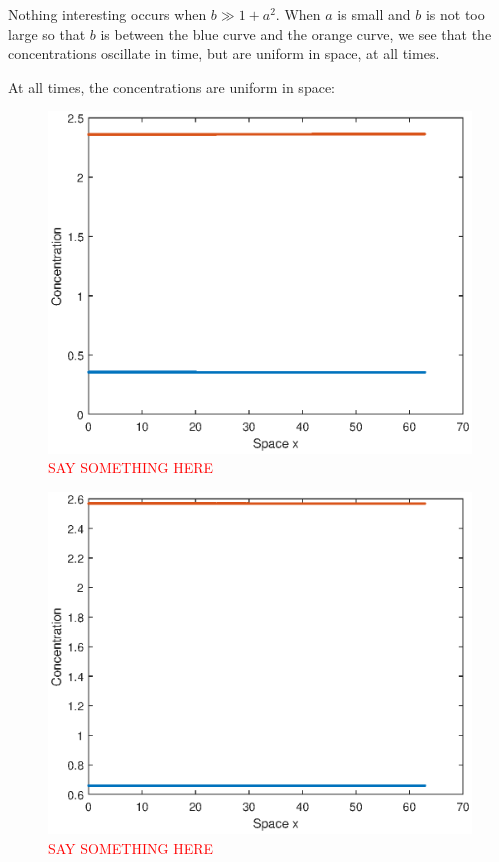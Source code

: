 \documentclass{book}
\theoremstyle{definition}
\begin{document}
Nothing interesting occurs when $b \gg 1+ a^2$. When $a$ is small and $b$ is not too large so that $b$ is between the blue curve and the orange curve, we see that the concentrations oscillate in time, but are uniform in space, at all times.


At all times, the concentrations are uniform in space:
\begin{figure}[!htb]
	\centering
	\includegraphics[scale=0.6]{Turing_patterns/Turing_7.eps}
	\caption{\textcolor{red}{SAY SOMETHING HERE}}
	\label{Fig:22}
\end{figure}

\begin{figure}[!htb]
	\centering
	\includegraphics[scale=0.6]{Turing_patterns/Turing_8.eps}
	\caption{\textcolor{red}{SAY SOMETHING HERE}}
	\label{Fig:23}
\end{figure}
\end{document}
